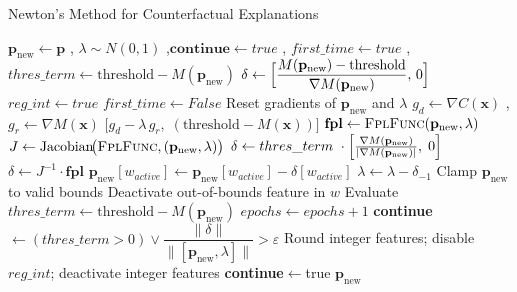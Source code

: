 \documentclass[12pt]{extarticle}
\numberwithin{equation}{section}
\begin{document}
\begin{algorithm}
    \caption{Newton's Method for Counterfactual Explanations}
\label{alg:newton_counterfactual}
\begin{algorithmic}[1]
     {} 
    \State $\mathbf{p}_{\text{new}} \gets \mathbf{p}$
    ,\; $\lambda \sim N(0, 1)$
    ,\;$\mathbf{continue} \gets true$
    ,\; $first\_time \gets true$
    ,\; $thres\_term \gets \text{threshold} - M(\mathbf{p}_{\text{new}})$
         
            \State $\delta \gets 
                \Bigl[\dfrac{M(\mathbf{p}_{\text{new}})
                        -\text{threshold}}
                    {\nabla M(\mathbf{p}_{\text{new}})} ,\,0\Bigr]$
        \Else
             
                \State $reg\_int \gets true$
                \State $first\_time \gets False$
            \EndIf
            \State Reset gradients of $\mathbf{p}_{\text{new}}$ and $\lambda$
             {}
                \State $g_{d} \gets \nabla C(\mathbf{x})$
                ,\;$g_{r} \gets \nabla M(\mathbf{x})$
                \State \Return $\bigl[g_{d}-\lambda\,g_{r},\;(\text{threshold}-M(\mathbf{x}))\bigr]$
            \EndFunction
            \State $\mathbf{fpl} \gets \textsc{FplFunc}(\mathbf{p}_{\text{new}},\lambda)$
            \State $J \gets \text{Jacobian}\!\bigl(\textsc{FplFunc},
                                (\mathbf{p}_{\text{new}},\lambda)\bigr)$
             
                \State $\delta \gets thres\_term\ \cdot
                        \Bigl[\frac{\nabla M(\mathbf{p}_{\text{new}})}{|\nabla M(\mathbf{p}_{\text{new}})|},\;0\Bigr]$
            \Else
                \State $\delta \gets J^{-1} \cdot \mathbf{fpl}$ 
            \EndIf
        \EndIf
        \State $\mathbf{p}_{\text{new}}[w_{active}] \gets 
                \mathbf{p}_{\text{new}}[w_{active}]- \delta[w_{active}] $
        \State $\lambda \gets \lambda - \delta_{-1}$
            \State Clamp $\mathbf{p}_{\text{new}}$ to valid bounds 
            \State Deactivate out-of-bounds feature in $w$
        \EndIf
        \State Evaluate $thres\_term \gets \text{threshold}-M(\mathbf{p}_{\text{new}})$
        \State $epochs \gets epochs+1$
        \State \textbf{continue} $\gets (thres\_term>0)\lor
                \dfrac{\lVert\delta\rVert}{\lVert[\mathbf{p}_{\text{new}},\lambda]\rVert}>\varepsilon$
            \State Round integer features;\; disable $reg\_int$;\; deactivate integer features
            \State \textbf{continue}$\gets$true
        \EndIf
    \EndWhile
    \State \Return $\mathbf{p}_{\text{new}}$
    \EndFunction
\end{algorithmic}
\end{algorithm}
\end{document}
